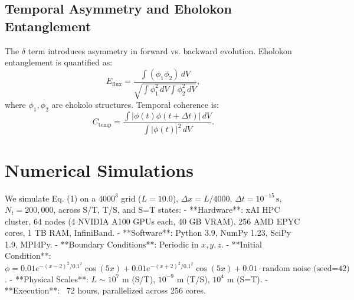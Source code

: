 \documentclass[11pt]{article}
\begin{document}
\subsection{Temporal Asymmetry and Eholokon Entanglement}
The \(\delta\) term introduces asymmetry in forward vs. backward evolution. Eholokon entanglement is quantified as:
\begin{equation}
E_{\text{flux}} = \frac{\int (\phi_1 \phi_2) \, dV}{\sqrt{\int \phi_1^2 \, dV \int \phi_2^2 \, dV}},
\end{equation}
where \(\phi_1, \phi_2\) are ehokolo structures. Temporal coherence is:
\begin{equation}
C_{\text{temp}} = \frac{\int |\phi(t) \phi(t + \Delta t)| \, dV}{\int |\phi(t)|^2 \, dV}.
\end{equation}

\section{Numerical Simulations}
We simulate Eq. (1) on a \(4000^3\) grid (\(L = 10.0\)), \(\Delta x = L / 4000\), \(\Delta t = 10^{-15} \, \text{s}\), \(N_t = 200,000\), across S/T, T/S, and S=T states:
- **Hardware**: xAI HPC cluster, 64 nodes (4 NVIDIA A100 GPUs each, 40 GB VRAM), 256 AMD EPYC cores, 1 TB RAM, InfiniBand.
- **Software**: Python 3.9, NumPy 1.23, SciPy 1.9, MPI4Py.
- **Boundary Conditions**: Periodic in \(x, y, z\).
- **Initial Condition**: \(\phi = 0.01 e^{-(x-2)^2/0.1^2} \cos(5x) + 0.01 e^{-(x+2)^2/0.1^2} \cos(5x) + 0.01 \cdot \text{random noise (seed=42)}\).
- **Physical Scales**: \(L \sim 10^7 \text{ m}\) (S/T), \(10^{-9} \text{ m}\) (T/S), \(10^4 \text{ m}\) (S=T).
- **Execution**: ~72 hours, parallelized across 256 cores.
\end{document}
